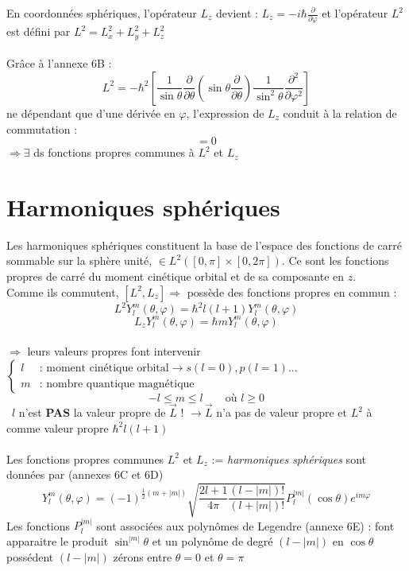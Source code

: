 \documentclass	[11pt, a4paper, openany]{book}
\newcommand{\danger}{{\huge\fontencoding{U}\fontfamily{futs}\selectfont\char 66\relax}\ }
\begin{document}
En coordonnées sphériques, l'opérateur $L_z$ devient : $L_z=-i\hbar\frac{\partial}{\partial\varphi}$ et l'opérateur $L^2$ est défini par $L^2=L^2_x+L_y^2+L_z^2$\\\\
Grâce à l'annexe 6B : \begin{equation}
L^2=-\hbar^2\left[\frac{1}{\sin\theta}\frac{\partial}{\partial\theta}\left(\sin\theta\frac{\partial}{\partial\theta}\right)\frac{1}{\sin^2\theta}\frac{\partial^2}{\partial\varphi^2}\right]
\end{equation}
ne dépendant que d'une dérivée en $\varphi$, l'expression de $L_z$ conduit à la relation de commutation :\begin{equation}
[L^2,L_z]=0
\end{equation}
$\Rightarrow\exists$ ds fonctions propres communes à $L^2$ et $L_z$
\section{Harmoniques sphériques}
Les harmoniques sphériques constituent la base de l'espace des fonctions de carré sommable sur la sphère unité, $\in L^2([0,\pi]\times[0,2\pi])$. Ce sont les fonctions propres de carré du moment cinétique orbital et de sa composante en $z$.\\
Comme ils commutent, $[L^2,L_z]\Rightarrow$ possède des fonctions propres en commun : \begin{equation}
L^2Y_l^m(\theta,\varphi)=\hbar^2l(l+1)Y_l^m(\theta,\varphi)
\end{equation}\begin{equation}
L_zY^m_l(\theta,\varphi)=\hbar mY_l^m(\theta,\varphi)
\end{equation}\ \\
$\Rightarrow$ leurs valeurs propres font intervenir $\left\{\begin{array}{cl}
l & \text{: moment cinétique orbital} \rightarrow s(l=0),p(l=1)...\\
m & \text{: nombre quantique magnétique}
\end{array}\right.$
\begin{equation}
-l\leq m\leq l\qquad \text{où }l\geq 0
\end{equation}
\danger $l$ n'est \textbf{PAS} la valeur propre de $\vec L$ ! $\rightarrow \vec L$ n'a pas de valeur propre et $L^2$ à comme valeur propre $\hbar^2l(l+1)$ \\\\
Les fonctions propres communes $L^2$ et $L_z$ := \textit{harmoniques sphériques} sont données par (annexes 6C et 6D)\begin{equation}
Y_l^m(\theta,\varphi)=(-1)^{\frac{1}{2}(m+|m|)}\sqrt{\frac{2l+1}{4\pi}\frac{(l-|m|)!}{(l+|m|)!}}P_l^{|m|}(\cos\theta)e^{im\varphi}
\end{equation}
Les fonctions $P_l^{|m|}$ sont associées aux polynômes de Legendre (annexe 6E) : font apparaitre le produit $\sin^{|m|}\theta$ et un polynôme de degré $(l-|m|)$ en $\cos\theta$ possédent $(l-|m|)$ zérons entre $\theta=0$ et $\theta=\pi$
\end{document}

